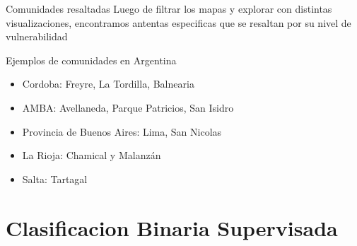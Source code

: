 \documentclass[xcolor=x11names]{beamer}
\begin{document}
\begin{frame}{Comunidades resaltadas}
	Luego de filtrar los mapas y explorar con distintas visualizaciones, encontramos antentas especificas que se resaltan por su nivel de vulnerabilidad

	\bigskip

	\begin{block}{Ejemplos de comunidades en Argentina}
		\begin{itemize}
			\item Cordoba: Freyre, La Tordilla, Balnearia
			\item AMBA: Avellaneda, Parque Patricios, San Isidro
			\item Provincia de Buenos Aires: Lima, San Nicolas
			\item La Rioja: Chamical y Malanz\'an
			\item Salta: Tartagal
		\end{itemize}

	\end{block}
\end{frame}




\section{Clasificacion Binaria Supervisada}
\end{document}
